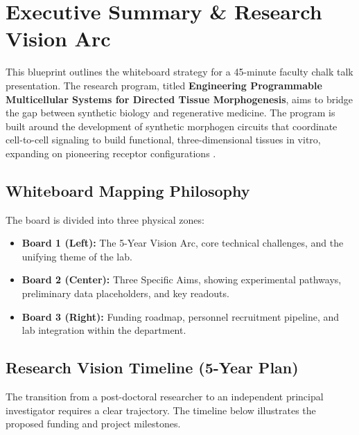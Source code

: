\section{Executive Summary \& Research Vision Arc}
This blueprint outlines the whiteboard strategy for a 45-minute faculty chalk talk presentation. The research program, titled \textbf{Engineering Programmable Multicellular Systems for Directed Tissue Morphogenesis}, aims to bridge the gap between synthetic biology and regenerative medicine. The program is built around the development of synthetic morphogen circuits that coordinate cell-to-cell signaling to build functional, three-dimensional tissues in vitro, expanding on pioneering receptor configurations \cite{robins2023engineering}.

\subsection{Whiteboard Mapping Philosophy}
The board is divided into three physical zones:
\begin{itemize}
    \item \textbf{Board 1 (Left):} The 5-Year Vision Arc, core technical challenges, and the unifying theme of the lab.
    \item \textbf{Board 2 (Center):} Three Specific Aims, showing experimental pathways, preliminary data placeholders, and key readouts.
    \item \textbf{Board 3 (Right):} Funding roadmap, personnel recruitment pipeline, and lab integration within the department.
\end{itemize}

\subsection{Research Vision Timeline (5-Year Plan)}
The transition from a post-doctoral researcher to an independent principal investigator requires a clear trajectory. The timeline below illustrates the proposed funding and project milestones.

